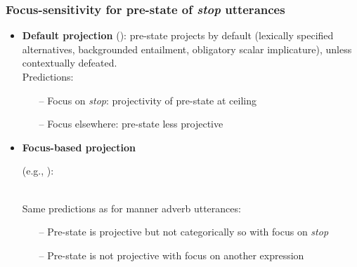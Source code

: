 \documentclass[pdf,xcolor=table,envcountsect,handout]{beamer}
\begin{document}
\begin{frame}
\frametitle{Focus-sensitivity for pre-state of {\em stop} utterances}

\begin{itemize}[topsep=-2pt,leftmargin=2ex]

\item {\bf Default projection} (\citealt{abusch10,abrusan2011,abrusan2016,romoli2015}): pre-state projects by default (lexically specified alternatives, backgrounded entailment, obligatory scalar implicature), unless contextually defeated. 
\pause
\\ Predictions:
\begin{itemize}
\item[--] Focus on {\em stop}: projectivity of pre-state at ceiling
\item[--] Focus elsewhere: pre-state less projective
\end{itemize}

\pause

\item {\bf Focus-based projection} \begin{small}(e.g., \citealt{best-question,brst-ar}):\end{small}
\\ Same predictions as for manner adverb utterances:
\pause
\begin{itemize}
\item[--] Pre-state is projective but not categorically so with focus on {\em stop}
\item[--] Pre-state is not projective with focus on another expression
\end{itemize}

\end{itemize}

\end{frame}
\end{document}
